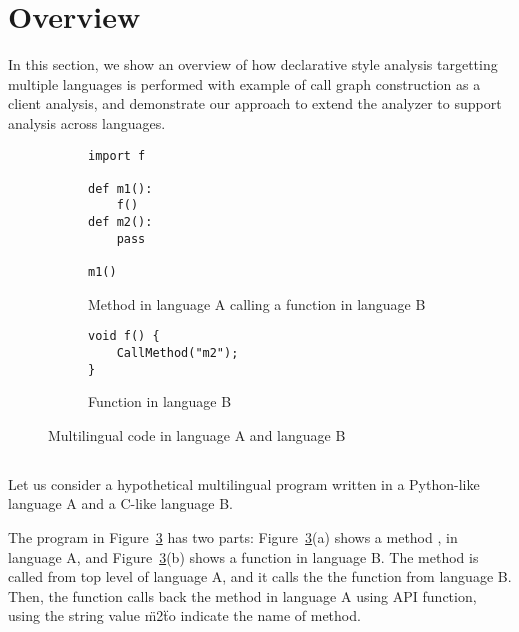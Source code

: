 \section{Overview}
In this section, we show an overview of how declarative style analysis
targetting multiple languages is performed with example of call graph
construction as a client analysis,
and demonstrate our approach to extend the analyzer to support analysis
across languages.

\begin{figure}[t]
  \centering
  \vspace{2mm}
  \begin{subfigure}[t]{0.5\textwidth}
    \begin{lstlisting}[style=java,xleftmargin=2.5em]
import f

def m1():
    f()
def m2():
    pass

m1()
    \end{lstlisting}
    \vspace*{-.5em}
    \caption{Method in language A calling a function in language B}
    \label{fig:exam:langA}
  \end{subfigure}
  \begin{subfigure}[t]{0.5\textwidth}
    \begin{lstlisting}[style=cpp,firstnumber=5,xleftmargin=2.5em]
void f() {
    CallMethod("m2");
}
    \end{lstlisting}
    \vspace*{-.5em}
    \caption{Function in language B}
    \label{fig:exam:langB}
  \end{subfigure}
  \vspace*{-.5em}
  \caption{Multilingual code in language A and language B}
  \label{fig:exam}
\end{figure}

\subsection{}

Let us consider a hypothetical multilingual program written in a Python-like language A
and a C-like language B.

The program in Figure~\ref{fig:exam} has two parts: Figure~\ref{fig:exam}(a)
shows a method ,  in language A, and
Figure~\ref{fig:exam}(b) shows a function  in language B.  The method
 is called from top level of language A, and it calls the the function 
from language B.  Then, the function  calls back the method  in language A
using API function, using the string value \"m2\" to indicate the name of method.

